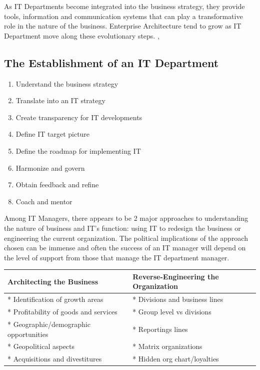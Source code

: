 \documentclass[]{book}
\providecommand{\tightlist}{%
  \setlength{\itemsep}{0pt}\setlength{\parskip}{0pt}}
\begin{document}
As IT Departments become integrated into the business strategy, they provide tools, information and communication systems that can play a transformative role in the nature of the business. Enterprise Architecture tend to grow as IT Department move along these evolutionary steps. \citep{Hohpe2017a}, \citep{Hohpe2017b}

\hypertarget{the-establishment-of-an-it-department}{%
\subsection{The Establishment of an IT Department}\label{the-establishment-of-an-it-department}}

\begin{enumerate}
\def\labelenumi{\arabic{enumi}.}
\tightlist
\item
  Understand the business strategy
\item
  Translate into an IT strategy
\item
  Create transparency for IT developments
\item
  Define IT target picture
\item
  Define the roadmap for implementing IT
\item
  Harmonize and govern
\item
  Obtain feedback and refine
\item
  Coach and mentor
\end{enumerate}

Among IT Managers, there appears to be 2 major approaches to understanding the nature of business and IT's function: using IT to redesign the business or engineering the current organization. The political implications of the approach chosen can be immense and often the success of an IT manager will depend on the level of support from those that manage the IT department manager.

\begin{longtable}[]{@{}ll@{}}
\toprule
Architecting the Business & Reverse-Engineering the Organization\tabularnewline
\midrule
\endhead
* Identification of growth areas & * Divisions and business lines\tabularnewline
* Profitability of goods and services & * Group level vs divisions\tabularnewline
* Geographic/demographic opportunities & * Reportings lines\tabularnewline
* Geopolitical aspects & * Matrix organizations\tabularnewline
* Acquisitions and divestitures & * Hidden org chart/loyalties\tabularnewline
\bottomrule
\end{longtable}
\end{document}
